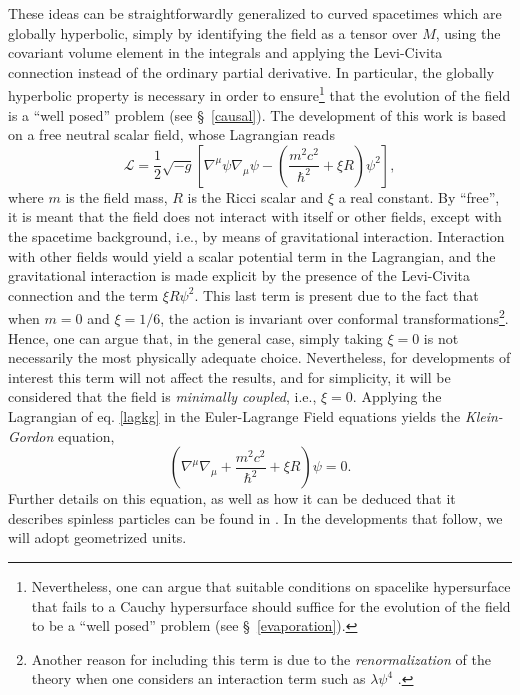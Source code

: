 \documentclass[
12pt,		%
openright,	%
twoside,  %
a4paper,			%
chapter=TITLE,		%
english,			%
french,				%
spanish,			%
brazil				%
]{USPSC-classe/USPSC}
\begin{document}
These ideas can be straightforwardly generalized to curved spacetimes which are globally hyperbolic, simply by identifying the field as a tensor over $M$, using the covariant volume element in the integrals and applying the Levi-Civita connection instead of the ordinary partial derivative. In particular, the globally hyperbolic property is necessary in order to ensure\footnote{Nevertheless, one can argue that suitable conditions on spacelike hypersurface that fails to a Cauchy hypersurface should suffice for the evolution of the field to be a ``well posed'' problem (see \S~\ref{evaporation}).} that the evolution of the field is a ``well posed'' problem (see \S~\ref{causal}). The development of this work is based on a free neutral scalar field, whose Lagrangian reads 
\begin{equation}\label{lagkg}
    \mathcal{L}=\frac{1}{2}\sqrt{-g}\left[\nabla^{\mu}\psi\nabla_{\mu}\psi-\left(\frac{m^2c^2}{\hbar^2}+\xi R\right)\psi^2\right],
\end{equation}
where $m$ is the field mass, $R$ is the Ricci scalar and $\xi$ a real constant. By ``free'', it is meant that the field does not interact with itself or other fields, except with the spacetime background, i.e., by means of gravitational interaction. Interaction with other fields would yield a scalar potential term in the Lagrangian, and the gravitational interaction is made explicit by the presence of the Levi-Civita connection and the term $\xi R\psi^2$. This last term is present due to the fact that when $m=0$ and $\xi=1/6$, the action is invariant over conformal transformations\footnote{Another reason for including this term is due to the \textit{renormalization} of the theory when one considers an interaction term such as $\lambda\psi^4$ \cite{Parker2009}.}. Hence, one can argue that, in the general case, simply taking $\xi=0$ is not necessarily the most physically adequate choice. Nevertheless, for developments of interest this term will not affect the results, and for simplicity, it will be considered that the field is \textit{minimally coupled}, i.e., $\xi=0$. Applying the Lagrangian of eq. \ref{lagkg} in the Euler-Lagrange Field equations yields the \textit{Klein-Gordon} equation,
\begin{equation}\label{kleingordon}
    \left(\nabla^{\mu}\nabla_{\mu}+\frac{m^2c^2}{\hbar^2}+\xi R\right)\psi=0.
\end{equation}
Further details on this equation, as well as how it can be deduced that it describes spinless particles can be found in \cite{Greiner2000}. In the developments that follow, we will adopt geometrized units.
\end{document}
